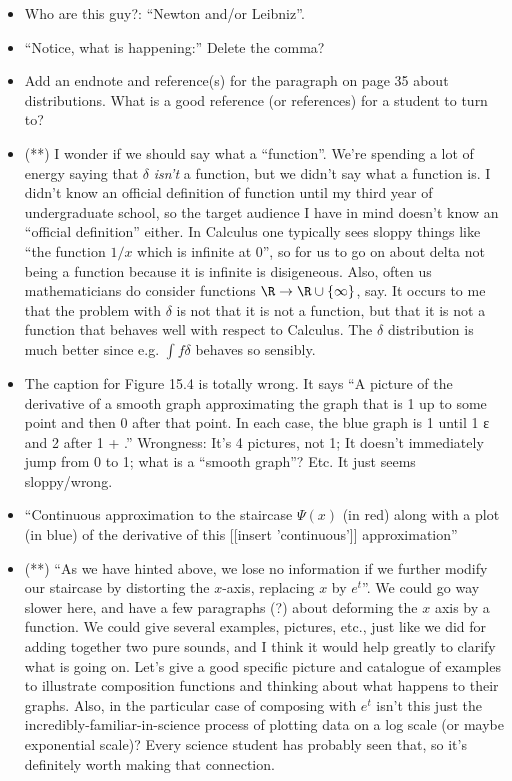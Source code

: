 \documentclass{article}
\begin{document}
\begin{itemize}
\item Who are this guy?:  ``Newton and/or Leibniz''.

\item ``Notice, what is happening:''  Delete the comma?

\item Add an endnote and reference(s) for the paragraph on page 35
  about distributions.  What is a good reference (or references) for a
  student to turn to?

\item (**) I wonder if we should say what a ``function''.  We're spending a
  lot of energy saying that $\delta$ {\em isn't} a function, but we
  didn't say what a function is.  I didn't know an official definition
  of function until my third year of undergraduate school, so the
  target audience I have in mind doesn't know an ``official
  definition'' either.  In Calculus one typically sees sloppy things
  like ``the function $1/x$ which is infinite at $0$'', so for us to
  go on about delta not being a function because it is infinite is
  disigeneous.  Also, often us mathematicians do consider functions
  $\R \to \R\cup\{\infty\}$, say.  It occurs to me that the problem
  with $\delta$ is not that it is not a function, but that it is not a
  function that behaves well with respect to Calculus.  The $\delta$
  distribution is much better since e.g. $\int f \delta$ behaves so
  sensibly.

\item The caption for Figure 15.4 is totally wrong. It says ``A
  picture of the derivative of a smooth graph approximating the graph
  that is 1 up to some point and then 0 after that point. In each
  case, the blue graph is 1 until 1 ε and 2 after 1 + .''
Wrongness:  It's 4 pictures, not 1;  It doesn't immediately jump from 0 to 1;
what is a ``smooth graph''?     Etc. It just seems sloppy/wrong.

\item ``Continuous approximation to the staircase $\Psi(x)$ (in red)
  along with a plot (in blue) of the derivative of this [[insert 'continuous']]
  approximation''

\item (**) ``As we have hinted above, we lose no information if we
  further modify our staircase by distorting the $x$-axis, replacing
  $x$ by $e^t$''.  We could go way slower here, and have a few
  paragraphs (?)  about deforming the $x$ axis by a function.  We
  could give several examples, pictures, etc., just like we did for
  adding together two pure sounds, and I think it would help greatly
  to clarify what is going on.  Let's give a good specific picture and
  catalogue of examples to illustrate composition functions and
  thinking about what happens to their graphs.  Also, in the
  particular case of composing with $e^t$ isn't this just the
  incredibly-familiar-in-science process of plotting data on a log
  scale (or maybe exponential scale)?  Every science student has
  probably seen that, so it's definitely worth making that connection.



\end{itemize}
\end{document}
